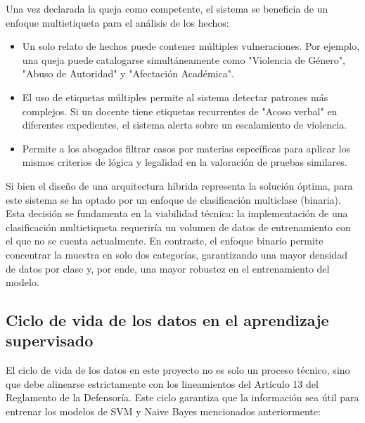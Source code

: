 Una vez declarada la queja como competente, el sistema se beneficia de un enfoque multietiqueta para el análisis de los hechos:
\begin{itemize}
    \item Un solo relato de hechos puede contener múltiples vulneraciones. Por ejemplo, una queja puede catalogarse simultáneamente como "Violencia de Género", "Abuso de Autoridad" y "Afectación Académica".
    \item El uso de etiquetas múltiples permite al sistema detectar patrones más complejos. Si un docente tiene etiquetas recurrentes de "Acoso verbal" en diferentes expedientes, el sistema alerta sobre un escalamiento de violencia.
    \item Permite a los abogados filtrar casos por materias específicas para aplicar los mismos criterios de lógica y legalidad en la valoración de pruebas similares.
\end{itemize}

Si bien el diseño de una arquitectura híbrida representa la solución óptima, para este sistema se ha optado por un enfoque de clasificación multiclase (binaria). Esta decisión se fundamenta en la viabilidad técnica: la implementación de una clasificación multietiqueta requeriría un volumen de datos de entrenamiento con el que no se cuenta actualmente. En contraste, el enfoque binario permite concentrar la muestra en solo dos categorías, garantizando una mayor densidad de datos por clase y, por ende, una mayor robustez en el entrenamiento del modelo.

\subsection{Ciclo de vida de los datos en el aprendizaje supervisado}

El ciclo de vida de los datos en este proyecto no es solo un proceso técnico, sino que debe alinearse estrictamente con los lineamientos del Artículo 13 del Reglamento de la Defensoría. Este ciclo garantiza que la información sea útil para entrenar los modelos de SVM y Naive Bayes mencionados anteriormente:

